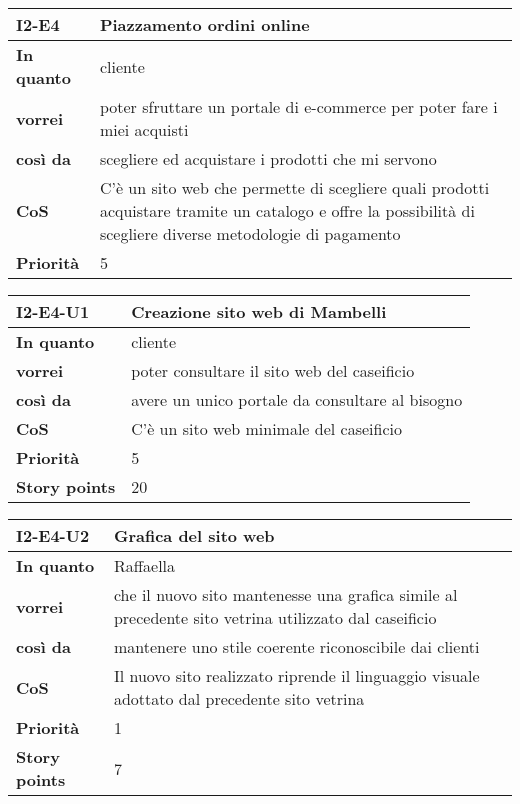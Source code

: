 \begin{table}[H]
  \begin{tabularx}{\textwidth}{lX}
    \toprule
    \textbf{I2-E4} & \textbf{Piazzamento ordini online} \\
    \midrule
    \textbf{In quanto} & cliente \\
    \textbf{vorrei} & poter sfruttare un portale di e-commerce per poter fare i miei acquisti \\
    \textbf{così da} & scegliere ed acquistare i prodotti che mi servono \\
    \midrule
    \textbf{CoS} & C'è un sito web che permette di scegliere quali prodotti acquistare tramite un catalogo e offre la possibilità di scegliere diverse metodologie di pagamento \\
    \midrule
    \textbf{Priorità} & 5 \\
    \bottomrule
  \end{tabularx}
  \label{user-story:i2-e4}
\end{table}

\begin{table}[H]
  \begin{tabularx}{\textwidth}{lX}
    \toprule
    \textbf{I2-E4-U1} & \textbf{Creazione sito web di Mambelli} \\
    \midrule
    \textbf{In quanto} & cliente \\
    \textbf{vorrei} & poter consultare il sito web del caseificio \\
    \textbf{così da} & avere un unico portale da consultare al bisogno \\
    \midrule
    \textbf{CoS} & C'è un sito web minimale del caseificio \\ 
    \midrule
    \textbf{Priorità} & 5 \\
    \textbf{Story points} & 20 \\
    \bottomrule
  \end{tabularx}
  \label{user-story:i2-e4-u1}
\end{table}

\begin{table}[H]
  \begin{tabularx}{\textwidth}{lX}
    \toprule
    \textbf{I2-E4-U2} & \textbf{Grafica del sito web} \\
    \midrule
    \textbf{In quanto} & Raffaella \\
    \textbf{vorrei} & che il nuovo sito mantenesse una grafica simile al precedente sito vetrina utilizzato dal caseificio \\
    \textbf{così da} & mantenere uno stile coerente riconoscibile dai clienti \\
    \midrule
    \textbf{CoS} & Il nuovo sito realizzato riprende il linguaggio visuale adottato dal precedente sito vetrina \\ 
    \midrule
    \textbf{Priorità} & 1 \\
    \textbf{Story points} & 7 \\
    \bottomrule
  \end{tabularx}
  \label{user-story:i2-e4-u2}
\end{table}

